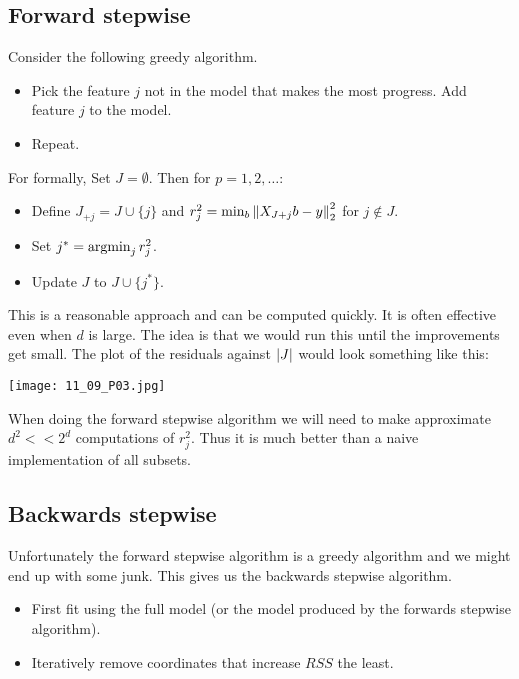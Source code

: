 \subsection{Forward stepwise}
Consider the following greedy algorithm.
\begin{itemize}
    \item Pick the feature $j$ not in the model that makes the most progress. Add feature $j$ to the model.
    \item Repeat.
\end{itemize}
For formally, Set $J=\emptyset$. Then for $p=1,2,\ldots$:
\begin{itemize}
    \item Define $J_{+j}= J \cup \{j\}$ and $r_j^2 = \min_b \left\|X_{J+j}b - y\right\|_2^2$ for $j \notin J$.
    \item Set $j^* = \operatorname*{argmin}_j r_j^2$.
    \item Update $J$ to $J\cup \{j^*\}$. 
\end{itemize}
This is a reasonable approach and can be computed quickly. It is often effective even when $d$ is large. The idea is that we would run this until the improvements get small. The plot of the residuals against ${\left\lvert J\right\rvert}$ would look something like this:

\begin{center}
    \texttt{[image: 11\_09\_P03.jpg]}
\end{center}

When doing the forward stepwise algorithm we will need to make approximate $d^2 << 2^d$ computations of $r_j^2$. Thus it is much better than a naive implementation of all subsets. 

\subsection{Backwards stepwise}
Unfortunately the forward stepwise algorithm is a greedy algorithm and we might end up with some junk. This gives us the backwards stepwise algorithm. 
\begin{itemize}
    \item First fit using the full model (or the model produced by the forwards stepwise algorithm).
    \item Iteratively remove coordinates that increase $RSS$ the least.
\end{itemize}

